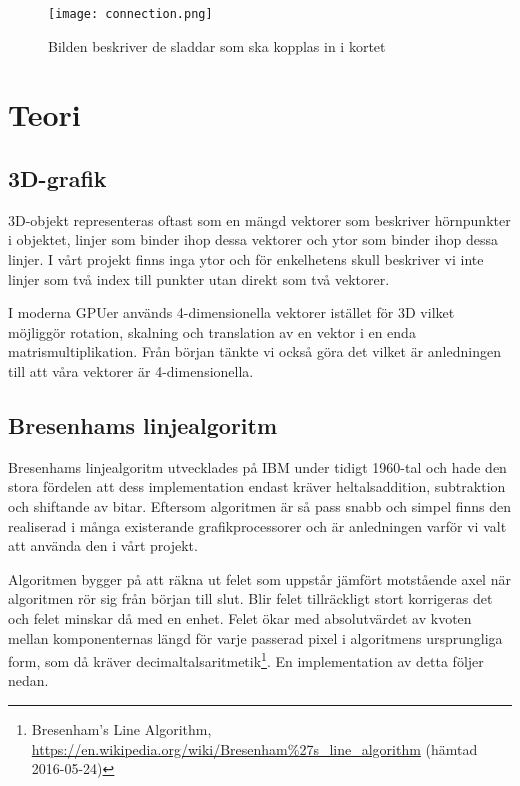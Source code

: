 \documentclass[a4paper]{article}
\begin{document}
    \begin{figure}[H]
        \centering
        \texttt{[image: connection.png]}
        \caption{Bilden beskriver  de sladdar som ska kopplas in i kortet}
        \label{fig:connection}
    \end{figure}

    


    \section{Teori}
    \subsection{3D-grafik}
    3D-objekt representeras oftast som en mängd vektorer som beskriver hörnpunkter i
    objektet, linjer som binder ihop dessa vektorer och ytor som binder ihop dessa
    linjer. I vårt projekt finns inga ytor och för enkelhetens skull beskriver vi
    inte linjer som två index till punkter utan direkt som två vektorer. 

    I moderna GPUer används 4-dimensionella  vektorer istället för 3D vilket
    möjliggör rotation, skalning och translation av en vektor i en enda
    matrismultiplikation. Från början tänkte vi också göra det vilket är anledningen
    till att våra  vektorer är 4-dimensionella. 

    
    \subsection{Bresenhams linjealgoritm}
    Bresenhams linjealgoritm utvecklades på IBM under tidigt 1960-tal och hade den
    stora fördelen att dess implementation endast kräver heltalsaddition,
    subtraktion och shiftande av bitar. Eftersom algoritmen är så pass snabb och
    simpel finns den realiserad i många existerande grafikprocessorer och är
    anledningen varför vi valt att använda den i vårt projekt.  

    Algoritmen bygger på att räkna ut felet som uppstår jämfört motstående axel när
    algoritmen rör sig från början till slut. Blir felet tillräckligt stort
    korrigeras det och felet minskar då med en enhet. Felet ökar med absolutvärdet
    av kvoten mellan komponenternas längd för varje passerad pixel i algoritmens
    ursprungliga form, som då kräver decimaltalsaritmetik\footnote{Bresenham's Line Algorithm, \url{https://en.wikipedia.org/wiki/Bresenham\%27s_line_algorithm} (hämtad 2016-05-24)}. En implementation av
    detta följer nedan. 
\end{document}
